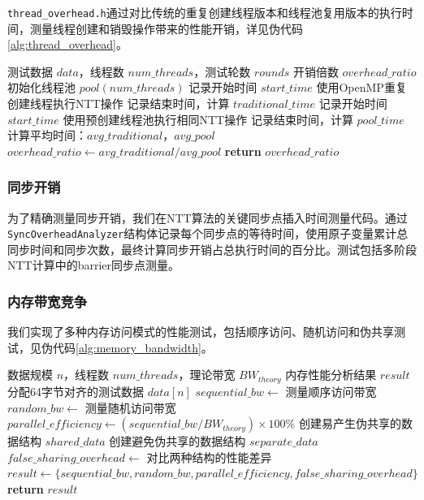 \documentclass[a4paper]{article}
\begin{document}
\texttt{thread\_overhead.h}通过对比传统的重复创建线程版本和线程池复用版本的执行时间，测量线程创建和销毁操作带来的性能开销，详见伪代码\ref{alg:thread_overhead}。

\begin{algorithm}[htbp]
\caption{线程创建开销对比测试}
\label{alg:thread_overhead}
\begin{algorithmic}[1]
\Require 测试数据 $data$，线程数 $num\_threads$，测试轮数 $rounds$
\Ensure 开销倍数 $overhead\_ratio$
\State 初始化线程池 $pool(num\_threads)$
    \State 记录开始时间 $start\_time$
    \State 使用OpenMP重复创建线程执行NTT操作
    \State 记录结束时间，计算 $traditional\_time$
    \State 记录开始时间 $start\_time$
    \State 使用预创建线程池执行相同NTT操作
    \State 记录结束时间，计算 $pool\_time$
\EndFor
\State 计算平均时间：$avg\_traditional$，$avg\_pool$
\State $overhead\_ratio \gets avg\_traditional / avg\_pool$
\State \textbf{return} $overhead\_ratio$
\end{algorithmic}
\end{algorithm}

\subsubsection{同步开销}

为了精确测量同步开销，我们在NTT算法的关键同步点插入时间测量代码。通过\texttt{SyncOverheadAnalyzer}结构体记录每个同步点的等待时间，使用原子变量累计总同步时间和同步次数，最终计算同步开销占总执行时间的百分比。测试包括多阶段NTT计算中的barrier同步点测量。

\subsubsection{内存带宽竞争}

我们实现了多种内存访问模式的性能测试，包括顺序访问、随机访问和伪共享测试，见伪代码\ref{alg:memory_bandwidth}。

\begin{algorithm}[htbp]
\caption{内存带宽竞争分析}
\label{alg:memory_bandwidth}
\begin{algorithmic}[1]
\Require 数据规模 $n$，线程数 $num\_threads$，理论带宽 $BW_{theory}$
\Ensure 内存性能分析结果 $result$
\State 分配64字节对齐的测试数据 $data[n]$
\State $sequential\_bw \gets$ 测量顺序访问带宽
\State $random\_bw \gets$ 测量随机访问带宽
\State $parallel\_efficiency \gets (sequential\_bw / BW_{theory}) \times 100\%$
    \State 创建易产生伪共享的数据结构 $shared\_data$
    \State 创建避免伪共享的数据结构 $separate\_data$
    \State $false\_sharing\_overhead \gets$ 对比两种结构的性能差异
\EndFor
\State $result \gets \{sequential\_bw, random\_bw, parallel\_efficiency, false\_sharing\_overhead\}$
\State \textbf{return} $result$
\end{algorithmic}
\end{algorithm}
\end{document}
